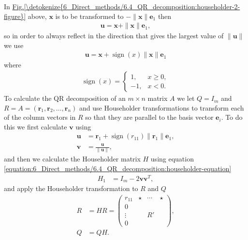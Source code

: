 \documentclass[letterpaper,10pt,english]{jupyterBook}
\begin{document}
\sphinxAtStartPar
In \hyperref[\detokenize{6_Direct_methods/6.4_QR_decomposition:householder-2-figure}]{Fig.\@ \ref{\detokenize{6_Direct_methods/6.4_QR_decomposition:householder-2-figure}}} above, \(\mathbf{x}\) is to be transformed to \(-\|\mathbf{x}\|\mathbf{e}_1\) then
\begin{align*}
    \mathbf{u} = \mathbf{x} + \|\mathbf{x}\| \mathbf{e}_1,
\end{align*}
\sphinxAtStartPar
so in order to always reflect in the direction that gives the largest value of \(\|\mathbf{u}\|\) we use
\begin{align*}
    \mathbf{u} = \mathbf{x} + \operatorname{sign}(x)\|\mathbf{x}\|\mathbf{e}_1 
\end{align*}
\sphinxAtStartPar
where
\begin{align*}
    \operatorname{sign}(x) = \begin{cases}
        1, & x \geq 0,\\
        -1, & x < 0.
    \end{cases}
\end{align*}
\sphinxAtStartPar
To calculate the QR decomposition of an \(m\times n\) matrix \(A\) we let \(Q=I_m\) and \(R=A=(\mathbf{r}_1, \mathbf{r}_2, \ldots, \mathbf{r}_n)\) and use Householder transformations to transform each of the column vectors in \(R\) so that they are parallel to the basis vector \(\mathbf{e}_i\). To do this we first calculate \(\mathbf{v}\) using
\begin{align*}
    \mathbf{u} &= \mathbf{r}_1 + \operatorname{sign}(r_{11})\| \mathbf{r}_1 \|\mathbf{e}_1 , \\
    \mathbf{v} &= \frac{\mathbf{u}}{\| \mathbf{u} \|},
\end{align*}
\sphinxAtStartPar
and then we calculate the Householder matrix \(H\) using equation \eqref{equation:6_Direct_methods/6.4_QR_decomposition:householder-equation}
\begin{align*}
    H_1 &= I_m - 2 \mathbf{v} \mathbf{v}^T,
\end{align*}
\sphinxAtStartPar
and apply the Householder transformation to \(R\) and \(Q\)
\begin{align*}
    R &= H R =
    \begin{pmatrix}
        r_{11} & \star  & \cdots  & \star \\
        0 \\
        \vdots  & & R' \\
        0
    \end{pmatrix},\\
    Q &= QH.
\end{align*}
\end{document}
